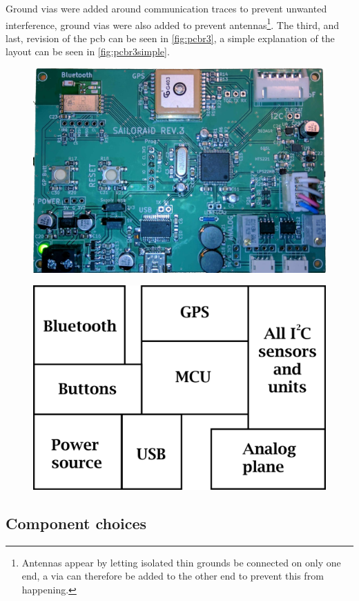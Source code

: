 Ground \gls{via}s were added around communication traces to prevent unwanted interference, ground \gls{via}s were also added to prevent antennas\footnote{Antennas appear by letting isolated thin grounds be connected on only one end, a \gls{via} can therefore be added to the other end to prevent this from happening.}.
The third, and last, revision of the \gls{pcb} can be seen in \autoref{fig:pcbr3}, a simple explanation of the layout can be seen in \autoref{fig:pcbr3simple}.
\begin{figure}[H]
	\centering
    \includegraphics[width=.8\linewidth]{Figures/pcb_rev3.jpg}
	\label{fig:pcbr3}
\end{figure}
\begin{figure}[H]
	\centering
    \includegraphics[width=.6\linewidth]{Figures/pcb_rev3_simple.png}
	\label{fig:pcbr3simple}
\end{figure}

\subsection{Component choices}\label{sec:hw:tip1}


